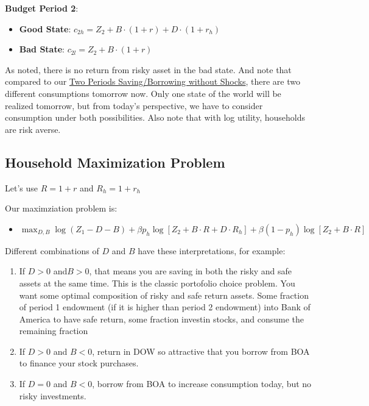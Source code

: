 \documentclass[
]{book}
\providecommand{\tightlist}{%
  \setlength{\itemsep}{0pt}\setlength{\parskip}{0pt}}
\begin{document}
\textbf{Budget Period 2}:

\begin{itemize}
\item
  \textbf{Good State}: \(c_{2h} =Z_2 +B\cdot (1+r)+D\cdot (1+r_h )\)
\item
  \textbf{Bad State}: \(c_{2l} =Z_2 +B\cdot (1+r)\)
\end{itemize}

As noted, there is no return from risky asset in the bad state. And note
that compared to our \href{https://fanwangecon.github.io/Math4Econ/derivative_application/K_save_households.html}{Two Periods Saving/Borrowing without
Shocks},
there are two different consumptions tomorrow now. Only one state of the
world will be realized tomorrow, but from today's perspective, we have
to consider consumption under both possibilities. Also note that with
log utility, households are risk averse.

\hypertarget{household-maximization-problem}{%
\subsection{Household Maximization Problem}\label{household-maximization-problem}}

Let's use \(R=1+r\) and \(R_h =1+r_h\)

Our maximziation problem is:

\begin{itemize}
\tightlist
\item
  \(\displaystyle \max_{D,B} \log (Z_1 -D-B)+\beta p_h \log \left\lbrack Z_2 +B\cdot R+D\cdot R_h \right\rbrack +\beta (1-p_h )\log \left\lbrack Z_2 +B\cdot R\right\rbrack\)
\end{itemize}

Different combinations of \(D\) and \(B\) have these interpretations, for
example:

\begin{enumerate}
\def\labelenumi{\arabic{enumi}.}
\item
  If \(D>0\) and\(B>0\), that means you are saving in both the risky and
  safe assets at the same time. This is the classic portofolio choice
  problem. You want some optimal composition of risky and safe return
  assets. Some fraction of period 1 endowment (if it is higher than
  period 2 endowment) into Bank of America to have safe return, some
  fraction investin stocks, and consume the remaining fraction
\item
  If \(D>0\) and \(B<0\), return in DOW so attractive that you borrow from
  BOA to finance your stock purchases.
\item
  If \(D=0\) and \(B<0\), borrow from BOA to increase consumption today,
  but no risky investments.
\end{enumerate}
\end{document}
